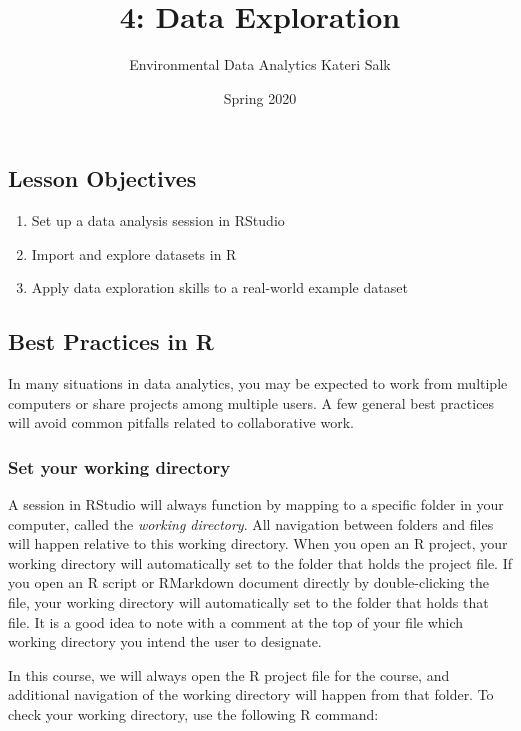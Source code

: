 \documentclass[]{article}
\title{4: Data Exploration}
\author{Environmental Data Analytics \textbar{} Kateri Salk}
\date{Spring 2020}
\providecommand{\tightlist}{%
  \setlength{\itemsep}{0pt}\setlength{\parskip}{0pt}}
\begin{document}
\maketitle

\hypertarget{lesson-objectives}{%
\subsection{Lesson Objectives}\label{lesson-objectives}}

\begin{enumerate}
\def\labelenumi{\arabic{enumi}.}
\tightlist
\item
  Set up a data analysis session in RStudio
\item
  Import and explore datasets in R
\item
  Apply data exploration skills to a real-world example dataset
\end{enumerate}

\hypertarget{best-practices-in-r}{%
\subsection{Best Practices in R}\label{best-practices-in-r}}

In many situations in data analytics, you may be expected to work from
multiple computers or share projects among multiple users. A few general
best practices will avoid common pitfalls related to collaborative work.

\hypertarget{set-your-working-directory}{%
\subsubsection{Set your working
directory}\label{set-your-working-directory}}

A session in RStudio will always function by mapping to a specific
folder in your computer, called the \emph{working directory}. All
navigation between folders and files will happen relative to this
working directory. When you open an R project, your working directory
will automatically set to the folder that holds the project file. If you
open an R script or RMarkdown document directly by double-clicking the
file, your working directory will automatically set to the folder that
holds that file. It is a good idea to note with a comment at the top of
your file which working directory you intend the user to designate.

In this course, we will always open the R project file for the course,
and additional navigation of the working directory will happen from that
folder. To check your working directory, use the following R command:
\end{document}
